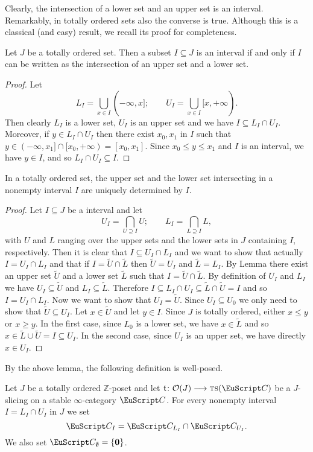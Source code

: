 Clearly, the intersection of a lower set and an upper set is an interval. Remarkably, in totally ordered sets also the converse is true. Although this is a classical (and easy) result, we recall its proof for completeness.
\begin{lemma}\label{lem.I-is-intersection}
Let $J$ be a totally ordered set. Then a subset $I\subseteq J$ is an interval if and only if $I$ can be written as the intersection of an upper set and a lower set.
\end{lemma}
\begin{proof}
Let 
\[
L_I=\bigcup_{x\in I} (-\infty,x]; \qquad  U_I=\bigcup_{x\in I} [x,+\infty).
\]
Then clearly $L_I$ is a lower set, $U_I$ is an upper set and we have $I\subseteq L_I\cap U_I$. Moreover, if $y\in L_I\cap U_I$ then there exist $x_0,x_1$ in $I$ such that $y\in (-\infty,x_1]\cap [x_0,+\infty)=[x_0,x_1]$. Since $x_0\leq y\leq x_1$ and $I$ is an interval, we have $y\in I$, and so $L_I\cap U_I\subseteq I$.
\end{proof}
\begin{lemma}
In a totally ordered set, the upper set and the lower set intersecting in a nonempty interval $I$ are uniquely determined by $I$.
\end{lemma}
\begin{proof}
Let $I\subseteq J$ be a interval and let 
\[
U_I=\bigcap_{U\supseteq I} U; \qquad L_I=\bigcap_{L\supseteq I} L,
\]
with $U$ and $L$ ranging over the upper sets and the lower sets in $J$ containing $I$, respectively. Then it is clear that $I\subseteq U_I\cap L_I$ and we want to show that actually $I=U_I\cap L_I$ and that if $I=\tilde{U}\cap \tilde{L}$ then $\tilde{U}=U_I$ and $\tilde{L}=L_I$. By Lemma  there exist an upper set $\tilde{U}$ and a lower set $\tilde{L}$ such that $I=\tilde{U}\cap \tilde{L}$. By definition of $U_I$ and $L_I$ we have $U_I\subseteq \tilde{U}$ and $L_I\subseteq \tilde{L}$. Therefore $I\subseteq L_I\cap U_I\subseteq \tilde{L}\cap \tilde{U}=I$ and so $I=U_I\cap L_I$. Now we want to show that $U_I=\tilde{U}$. Since $U_I\subseteq U_0$ we only need to show that $\tilde{U}\subseteq U_I$. Let $x\in \tilde{U}$ and let $y\in I$. Since $J$ is totally ordered, either $x\leq y$ or $x\geq y$. In the first case, since $L_0$ is a lower set, we have $x\in \tilde{L}$ and so $x\in \tilde{L}\cup \tilde{U}=I\subseteq U_I$. In the second case, since $U_I$ is an upper set, we have directly $x\in U_I$.
\end{proof}
By the above lemma, the following definition is well-posed.
\begin{definition}\label{std.endocardium}
Let $J$ be a totally ordered $\mathbb{Z}$-poset and let $\tee\colon \O(J)\to \ts(\C)$ be a $J$-slicing on a stable $\infty$-category $\C$. For every nonempty interval $I=L_I\cap U_I$ in $J$ we set 
\[
\C_I=\C_{L_I}\cap \C_{U_I}.
\]
We also set $\C_\emptyset=\{\mathbf{0}\}$.
\end{definition}
